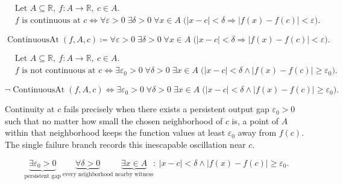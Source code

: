 \begin{remark*}
\[
\begin{aligned}
&\text{Let } A \subseteq \mathbb{R},\ f:A\to\mathbb{R},\ c\in A.\\
&f \text{ is continuous at } c
\Longleftrightarrow
\forall \varepsilon>0\;\exists \delta>0\;\forall x\in A\;
\bigl(|x-c|<\delta \Rightarrow |f(x)-f(c)|<\varepsilon\bigr).
\end{aligned}
\]
\end{remark*}

\begin{remark*}
\[
\operatorname{ContinuousAt}(f,A,c)
\coloneqq
\forall \varepsilon>0\;\exists \delta>0\;\forall x\in A\;
\bigl(|x-c|<\delta \Rightarrow |f(x)-f(c)|<\varepsilon\bigr).
\]
\end{remark*}

\begin{remark*}
\[
\begin{aligned}
&\text{Let } A \subseteq \mathbb{R},\ f:A\to\mathbb{R},\ c\in A.\\
&f \text{ is not continuous at } c
\Longleftrightarrow
\exists \varepsilon_0>0\;\forall \delta>0\;\exists x\in A\;
\bigl(|x-c|<\delta \land |f(x)-f(c)| \ge \varepsilon_0\bigr).
\end{aligned}
\]
\end{remark*}

\begin{remark*}
\[
\neg\operatorname{ContinuousAt}(f,A,c)
\Longleftrightarrow
\exists \varepsilon_0>0\;\forall \delta>0\;\exists x\in A\;
\bigl(|x-c|<\delta \land |f(x)-f(c)| \ge \varepsilon_0\bigr).
\]
\end{remark*}

\begin{remark*}
Continuity at $c$ fails precisely when there exists a persistent output gap $\varepsilon_0>0$ such that no matter how small the chosen neighborhood of $c$ is, a point of $A$ within that neighborhood keeps the function values at least $\varepsilon_0$ away from $f(c)$. The single failure branch records this inescapable oscillation near $c$.
\end{remark*}

\begin{remark*}
\[
\underbrace{\exists \varepsilon_0>0}_{\text{persistent gap}}
\ \underbrace{\forall \delta>0}_{\text{every neighborhood}}
\ \underbrace{\exists x\in A}_{\text{nearby witness}}
:\
|x-c|<\delta \land |f(x)-f(c)| \ge \varepsilon_0.
\]
\end{remark*}

